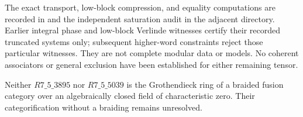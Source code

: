 The exact transport, low-block compression, and equality computations
are recorded in  and
the independent saturation audit in the adjacent 
directory.  Earlier integral phase and low-block Verlinde witnesses
certify their recorded truncated systems only; subsequent higher-word
constraints reject those particular witnesses.  They are not complete
modular data or models.  No coherent associators or general exclusion
have been established for either remaining tensor.

\begin{proposition}
\label{prop:m5-frontier-no-braiding}
Neither $R7\_5\_3895$ nor $R7\_5\_5039$ is the Grothendieck ring of
a braided fusion category over an algebraically closed field of
characteristic zero.  Their categorification without a braiding remains
unresolved.
\end{proposition}
